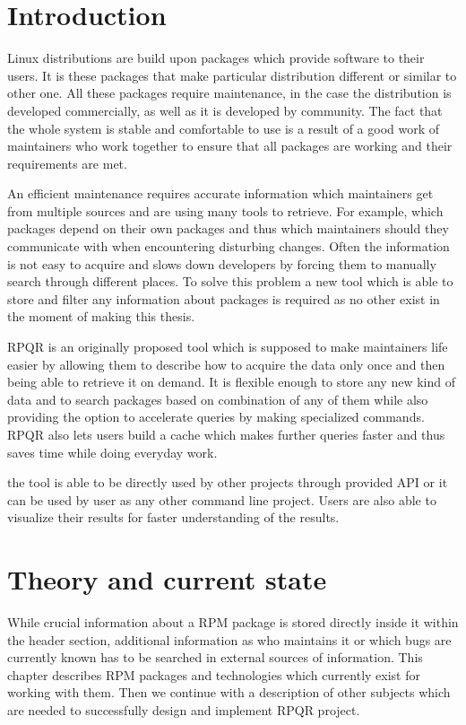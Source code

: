 \setlength{\parindent}{0em}
\setlength{\parskip}{1em}
\chapter{Introduction}

Linux distributions are build upon packages which provide software to their users. It is these
packages that make particular distribution different or similar to other one. All these packages require
maintenance, in the case the distribution is developed commercially, as well as it is developed by community.
The fact that the whole system is stable and comfortable to use is a result of a good work of
maintainers who work together to ensure that all packages are working and their
requirements are met.

An efficient maintenance requires accurate information which maintainers get from multiple sources
and are using many tools to retrieve. For example, which packages depend on their own packages and thus which
maintainers should they communicate with when encountering disturbing changes. Often the information
is not easy to acquire and slows down developers by forcing them to manually search through different
places. To solve this problem a new tool which is able to store and filter any information about
packages is required as no other exist in the moment of making this thesis.

RPQR is an originally proposed tool which is supposed to make maintainers life easier by allowing them to describe how
to acquire the data only once and then being able to retrieve it on demand. It is flexible
enough to store any new kind of data and to search packages based on combination of any of them while
also providing the option to accelerate queries by making specialized commands.
RPQR also lets users build a cache which makes further queries faster and thus saves time while
doing everyday work.

the tool is able to be directly used by other projects through provided API or it can be used
by user as any other command line project. Users are also able to visualize their
results for faster understanding of the results.

\chapter{Theory and current state}
While crucial information about a RPM package is stored directly inside it within the header section,
additional information as who maintains it or which bugs are currently known has to be searched
in external sources of information. This chapter describes RPM packages and technologies which
currently exist for working with them. Then we continue with a description of other subjects which are needed
to successfully design and implement RPQR project.


